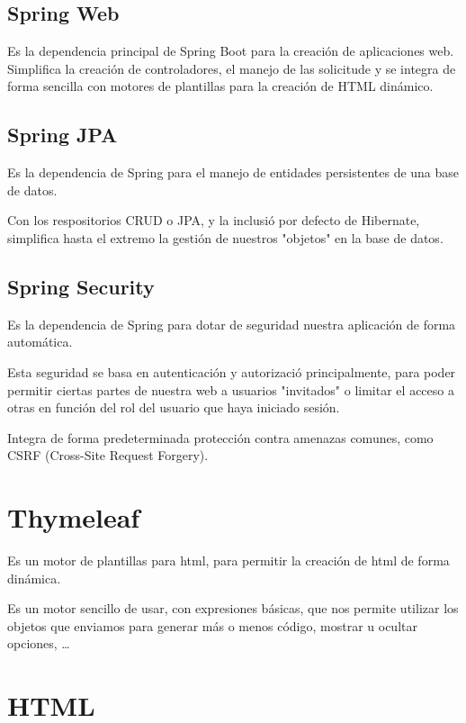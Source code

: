 \subsection{Spring Web}

Es la dependencia principal de Spring Boot para la creación de aplicaciones web. 
Simplifica la creación de controladores, el manejo de las solicitude y se integra de forma sencilla con motores de plantillas para la creación de HTML dinámico.

\subsection{Spring JPA}

Es la dependencia de Spring para el manejo de entidades persistentes de una base de datos. 

Con los respositorios CRUD o JPA, y la inclusió por defecto de Hibernate, simplifica hasta el extremo la gestión de nuestros "objetos" en la base de datos.

\subsection{Spring Security}

Es la dependencia de Spring para dotar de seguridad nuestra aplicación de forma automática.

Esta seguridad se basa en autenticación y autorizació principalmente, para poder permitir ciertas partes de nuestra web a usuarios "invitados" o limitar el acceso a otras en función del rol del usuario que haya iniciado sesión.

Integra de forma predeterminada protección contra amenazas comunes, como CSRF (Cross-Site Request Forgery).

\section{Thymeleaf}

Es un motor de plantillas para html, para permitir la creación de html de forma dinámica.

Es un motor sencillo de usar, con expresiones básicas, que nos permite utilizar los objetos que enviamos para generar más o menos código, mostrar u ocultar opciones, \dots

\section{HTML}


